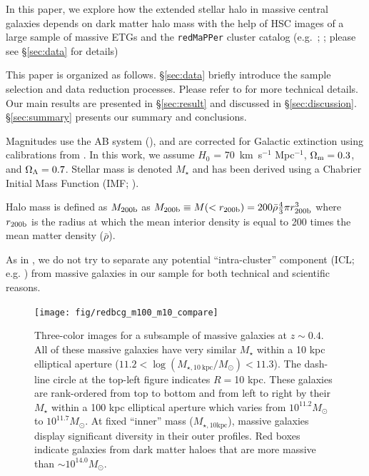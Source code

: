 \documentclass[a4paper,fleqn,usenatbib]{mnras}
\def\redm{\texttt{redMaPPer}}
\def\mstar{{$M_{\star}$}}
\def\minn{{$M_{\star,10\mathrm{kpc}}$}}
\begin{document}
    In this paper, we explore how the extended stellar halo in massive central galaxies
    depends on dark matter halo mass with the help of HSC images of a large sample 
    of massive ETGs and the \redm{} cluster catalog (e.g.\ \citealt{Rykoff2014}; 
    \citealt{Rozo2015b}; please see \S \ref{sec:data} for details)
    
    This paper is organized as follows. 
    \S \ref{sec:data} briefly introduce the sample selection and data reduction 
    processes.  
    Please refer to \citet{hscMassiveI} for more technical details.
    Our main results are presented in \S \ref{sec:result} and discussed in 
    \S \ref{sec:discussion}. 
    \S \ref{sec:summary} presents our summary and conclusions.

    Magnitudes use the AB system (\citealt{Oke1983}), and are corrected for Galactic 
    extinction using calibrations from \citet{Schlafly11}.
    In this work, we assume $H_0$ = 70~km~s$^{-1}$ Mpc$^{-1}$, ${\Omega}_{\rm m}=0.3$, 
    and ${\Omega}_{\rm \Lambda}=0.7$.
    Stellar mass is denoted \mstar{} and has been derived using a Chabrier Initial Mass 
    Function (IMF; \citealt{Chabrier2003}).   
      
    Halo mass is defined as $M_{\rm 200b}$ as 
    $M_{\rm 200b}\equiv M(<r_{\rm 200b})=200\bar{\rho} 
    \frac{4}{3}\pi r_{\rm 200b}^3$ where $r_{\rm 200b}$
    is the radius at which the mean interior density is equal to 200 times
    the mean matter density ($\bar{\rho}$). 
    
    As in \citet{hscMassiveI}, we do not try to separate any potential ``intra-cluster''
    component (ICL; e.g. \citealt{Carlberg1997, Lin2004, Gonzalez2005, Mihos2005}) from 
    massive galaxies in our sample for both technical and scientific reasons.  

  \begin{figure}
      \centering 
      \texttt{[image: fig/redbcg\_m100\_m10\_compare]}
      \caption{
          Three-color images for a subsample of massive galaxies at $z{\sim}0.4$. 
          All of these massive galaxies have very similar \mstar{} within a 10 kpc 
          elliptical aperture 
          ($11.2<\log (M_{\star,10\ \mathrm{kpc}}/M_{\odot})<11.3$). 
          The dash-line circle at the top-left figure indicates $R=$10 kpc.
          These galaxies are rank-ordered from top to bottom and from left to right 
          by their \mstar{} within a 100 kpc elliptical aperture which varies 
          from $10^{11.2} M_{\odot}$ to $10^{11.7} M_{\odot}$. 
          At fixed ``inner'' mass (\minn{}), massive galaxies display significant
          diversity in their outer profiles. 
          Red boxes indicate galaxies from dark matter haloes that are more massive 
          than ${\sim} 10^{14.0} M_{\odot}$. 
          }
      \label{fig:m100_m10_color}
  \end{figure}
\end{document}
